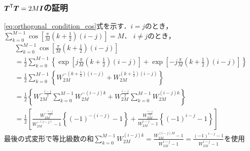 \documentclass[14pt,xcolor=dvipsnames,table,dvipdfmx]{beamer}
\begin{document}
\begin{frame}[c]
    \frametitle{$\boldsymbol{T}^{\mathsf{T}} \boldsymbol{T} = 2M\boldsymbol{I}$の証明}
    \eqref{eq:orthogonal_condition_cos}式を示す．$i = j$のとき，
    \scriptsize
    $\sum_{k = 0}^{M - 1} \cos\left[ \frac{\pi}{M} \left( k + \frac{1}{2} \right) ( i - j ) \right] = M$．
    \normalsize
    $i \neq j$のとき，
    \scriptsize
    \begin{align*}
        & \sum_{k = 0}^{M - 1} \cos\left[ \frac{\pi}{M} \left( k + \frac{1}{2} \right) ( i - j ) \right] \\
        &= \frac{1}{2} \sum_{k = 0}^{M - 1} \left\{ \exp\left[ j \frac{\pi}{M}  \left( k + \frac{1}{2} \right) (i - j) \right] + \exp\left[ -j \frac{\pi}{M} \left( k + \frac{1}{2} \right) (i - j) \right] \right\} \\
        &= \frac{1}{2} \sum_{k = 0}^{M - 1} \left\{ W_{2M}^{-\left( k + \frac{1}{2} \right)(i - j)} + W_{2M}^{\left( k + \frac{1}{2} \right)(i - j)} \right\} \nonumber \\
        &= \frac{1}{2} \left\{ W_{2M}^{-\frac{i - j}{2}} \sum_{k = 0}^{M - 1} W_{2M}^{-(i - j)k} + W_{2M}^{\frac{i - j}{2}} \sum_{k = 0}^{M - 1} W_{2M}^{(i - j)k} \right\} \\
        &= \frac{1}{2} \left[ \frac{W_{2M}^{-\frac{i - j}{2}}}{W_{2M}^{-(i - j)} - 1} \left\{ (-1)^{-(i - j)} - 1 \right\} + \frac{W_{2M}^{\frac{i - j}{2}}}{W_{2M}^{i - j} - 1} \left\{ (-1)^{i - j} - 1 \right\} \right]
    \end{align*}
    最後の式変形で等比級数の和$\sum_{k = 0}^{M - 1} W_{2M}^{(i - j)k} = \frac{W_{2M}^{(i -j)M} - 1}{W_{2M}^{i - j} - 1} = \frac{(-1)^{i - j} - 1}{W_{2M}^{i - j} - 1}$を使用
\end{frame}
\end{document}
